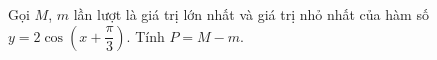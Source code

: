 \begin{ex}
Gọi $M$, $m$ lần lượt là giá trị lớn nhất và giá trị nhỏ nhất của hàm số $y=2\cos\left(x+\dfrac{\pi}{3}\right)$. Tính $P=M-m$.
\end{ex}
